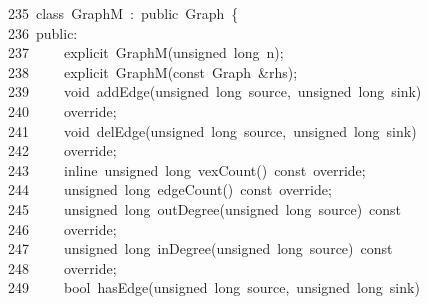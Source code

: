 \documentclass{ctexart}
\newcommand{\hlstd}[1]{\textcolor[rgb]{0.2,0.2,0.2}{#1}}
\newcommand{\hlopt}[1]{\textcolor[rgb]{0.2,0.2,0.2}{#1}}
\newcommand{\hllin}[1]{\textcolor[rgb]{0.59,0.59,0.59}{#1}}
\newcommand{\hlkwb}[1]{\textcolor[rgb]{0.63,0,0.31}{#1}}
\newcommand{\hlkwc}[1]{\textcolor[rgb]{0,0.63,0.31}{#1}}
\newcommand{\hlkwd}[1]{\textcolor[rgb]{0.78,0.23,0.41}{#1}}
\begin{document}
\hllin{235\ }\hlstd{}\hlkwc{class\ }\hlstd{GraphM\ }\hlopt{:\ }\hlstd{}\hlkwc{public\ }\hlstd{Graph\ }\hlopt{\{}\\
\hllin{236\ }\hlstd{}\hlkwc{public}\hlstd{}\hlopt{:}\\
\hllin{237\ }\hlstd{}\hlstd{\ \ \ \ }\hlstd{}\hlkwc{explicit\ }\hlstd{}\hlkwd{GraphM}\hlstd{}\hlopt{(}\hlstd{}\hlkwb{unsigned\ long\ }\hlstd{n}\hlopt{);}\\
\hllin{238\ }\hlstd{}\hlstd{\ \ \ \ }\hlstd{}\hlkwc{explicit\ }\hlstd{}\hlkwd{GraphM}\hlstd{}\hlopt{(}\hlstd{}\hlkwb{const\ }\hlstd{Graph\ }\hlopt{\&}\hlstd{rhs}\hlopt{);}\\
\hllin{239\ }\hlstd{}\hlstd{\ \ \ \ }\hlstd{}\hlkwb{void\ }\hlstd{}\hlkwd{addEdge}\hlstd{}\hlopt{(}\hlstd{}\hlkwb{unsigned\ long\ }\hlstd{source}\hlopt{,\ }\hlstd{}\hlkwb{unsigned\ long\ }\hlstd{sink}\hlopt{)\ }\Righttorque\\
\hllin{240\ }\hlstd{}\hlstd{\ \ \ \ }\hlstd{override}\hlopt{;}\\
\hllin{241\ }\hlstd{}\hlstd{\ \ \ \ }\hlstd{}\hlkwb{void\ }\hlstd{}\hlkwd{delEdge}\hlstd{}\hlopt{(}\hlstd{}\hlkwb{unsigned\ long\ }\hlstd{source}\hlopt{,\ }\hlstd{}\hlkwb{unsigned\ long\ }\hlstd{sink}\hlopt{)\ }\Righttorque\\
\hllin{242\ }\hlstd{}\hlstd{\ \ \ \ }\hlstd{override}\hlopt{;}\\
\hllin{243\ }\hlstd{}\hlstd{\ \ \ \ }\hlstd{}\hlkwc{inline\ }\hlstd{}\hlkwb{unsigned\ long\ }\hlstd{}\hlkwd{vexCount}\hlstd{}\hlopt{()\ }\hlstd{}\hlkwb{const\ }\hlstd{override}\hlopt{;}\\
\hllin{244\ }\hlstd{}\hlstd{\ \ \ \ }\hlstd{}\hlkwb{unsigned\ long\ }\hlstd{}\hlkwd{edgeCount}\hlstd{}\hlopt{()\ }\hlstd{}\hlkwb{const\ }\hlstd{override}\hlopt{;}\\
\hllin{245\ }\hlstd{}\hlstd{\ \ \ \ }\hlstd{}\hlkwb{unsigned\ long\ }\hlstd{}\hlkwd{outDegree}\hlstd{}\hlopt{(}\hlstd{}\hlkwb{unsigned\ long\ }\hlstd{source}\hlopt{)\ }\hlstd{}\hlkwb{const\ }\Righttorque\\
\hllin{246\ }\hlstd{}\hlstd{\ \ \ \ }\hlstd{override}\hlopt{;}\\
\hllin{247\ }\hlstd{}\hlstd{\ \ \ \ }\hlstd{}\hlkwb{unsigned\ long\ }\hlstd{}\hlkwd{inDegree}\hlstd{}\hlopt{(}\hlstd{}\hlkwb{unsigned\ long\ }\hlstd{source}\hlopt{)\ }\hlstd{}\hlkwb{const\ }\Righttorque\\
\hllin{248\ }\hlstd{}\hlstd{\ \ \ \ }\hlstd{override}\hlopt{;}\\
\hllin{249\ }\hlstd{}\hlstd{\ \ \ \ }\hlstd{}\hlkwb{bool\ }\hlstd{}\hlkwd{hasEdge}\hlstd{}\hlopt{(}\hlstd{}\hlkwb{unsigned\ long\ }\hlstd{source}\hlopt{,\ }\hlstd{}\hlkwb{unsigned\ long\ }\hlstd{sink}\hlopt{)\ }\Righttorque\\
\end{document}
